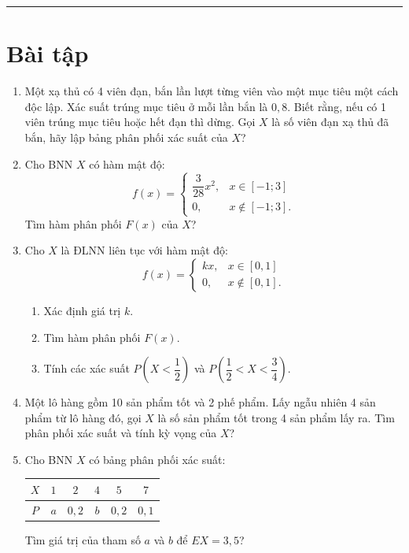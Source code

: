 \documentclass[12pt,a4paper]{article}
\theoremstyle{definition}
\begin{document}
\vspace{1.5em}
\hrule
\vspace{1.5em}

\section{Bài tập}

\begin{enumerate}[label=\textbf{\arabic*.}]
    \item Một xạ thủ có 4 viên đạn, bắn lần lượt từng viên vào một mục tiêu một cách độc lập. Xác suất trúng mục tiêu ở mỗi lần bắn là $0{,}8$. Biết rằng, nếu có 1 viên trúng mục tiêu hoặc hết đạn thì dừng. Gọi $X$ là số viên đạn xạ thủ đã bắn, hãy lập bảng phân phối xác suất của $X$?

    \item Cho BNN $X$ có hàm mật độ:
    \[
    f(x) = \begin{cases}
    \dfrac{3}{28} x^2, & x \in [-1; 3] \\
    0, & x \notin [-1; 3].
    \end{cases}
    \]
    Tìm hàm phân phối $F(x)$ của $X$?

    \item Cho $X$ là ĐLNN liên tục với hàm mật độ:
    \[
    f(x) = \begin{cases}
    kx, & x \in [0, 1] \\
    0, & x \notin [0, 1].
    \end{cases}
    \]
    \begin{enumerate}[label=\arabic*)]
        \item Xác định giá trị $k$.
        \item Tìm hàm phân phối $F(x)$.
        \item Tính các xác suất $P\left(X < \dfrac{1}{2}\right)$ và $P\left(\dfrac{1}{2} < X < \dfrac{3}{4}\right)$.
    \end{enumerate}

    \item Một lô hàng gồm 10 sản phẩm tốt và 2 phế phẩm. Lấy ngẫu nhiên 4 sản phẩm từ lô hàng đó, gọi $X$ là số sản phẩm tốt trong 4 sản phẩm lấy ra. Tìm phân phối xác suất và tính kỳ vọng của $X$?

    \item Cho BNN $X$ có bảng phân phối xác suất:
    \begin{center}
    \begin{tabular}{|c|c|c|c|c|c|}
    \hline
    $X$ & $1$ & $2$ & $4$ & $5$ & $7$ \\
    \hline
    $P$ & $a$ & $0{,}2$ & $b$ & $0{,}2$ & $0{,}1$ \\
    \hline
    \end{tabular}
    \end{center}
    Tìm giá trị của tham số $a$ và $b$ để $EX = 3{,}5$?


\end{enumerate}
\end{document}
